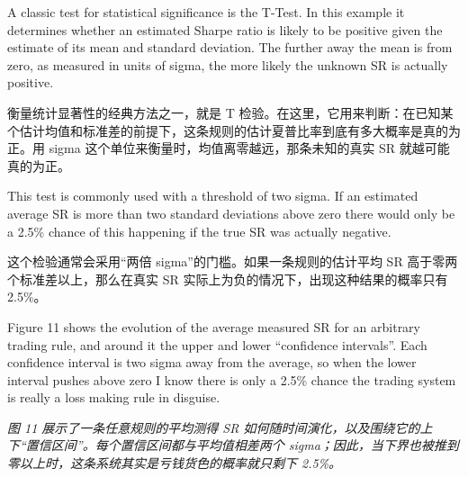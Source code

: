 \bipairgap

\begin{englishblock} A classic test for statistical significance is the T-Test. In this example it determines whether an estimated Sharpe ratio is likely to be positive given the estimate of its mean and standard deviation. The further away the mean is from zero, as measured in units of sigma, the more likely the unknown SR is actually positive. \end{englishblock}

\begin{chineseblock}衡量统计显著性的经典方法之一，就是 T 检验。在这里，它用来判断：在已知某个估计均值和标准差的前提下，这条规则的估计夏普比率到底有多大概率是真的为正。用 sigma 这个单位来衡量时，均值离零越远，那条未知的真实 SR 就越可能真的为正。\end{chineseblock}

\bipairgap

\begin{englishblock} This test is commonly used with a threshold of two sigma. If an estimated average SR is more than two standard deviations above zero there would only be a 2.5\% chance of this happening if the true SR was actually negative. \end{englishblock}

\begin{chineseblock}这个检验通常会采用“两倍 sigma”的门槛。如果一条规则的估计平均 SR 高于零两个标准差以上，那么在真实 SR 实际上为负的情况下，出现这种结果的概率只有 2.5\%。 \end{chineseblock}

\bipairgap

\begin{englishblock} Figure 11 shows the evolution of the average measured SR for an arbitrary trading rule, and around it the upper and lower ``confidence intervals''. Each confidence interval is two sigma away from the average, so when the lower interval pushes above zero I know there is only a 2.5\% chance the trading system is really a loss making rule in disguise. \end{englishblock}

\begin{chineseblock} \textit{图 11 展示了一条任意规则的平均测得 SR 如何随时间演化，以及围绕它的上下“置信区间”。每个置信区间都与平均值相差两个 sigma；因此，当下界也被推到零以上时，这条系统其实是亏钱货色的概率就只剩下 2.5\%。} \end{chineseblock}

